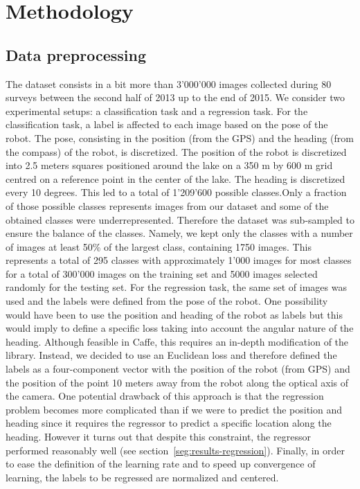 \section{Methodology}

%

%

\subsection{Data preprocessing}


The dataset consists in a bit more than 3'000'000 images collected during 80 surveys between the second half of 2013 up to the end of 2015. We consider two experimental setups: a classification task and a regression task. For the classification task, a label is affected to each image based on the pose of the robot. The pose, consisting in the position (from the GPS) and the heading (from the compass) of the robot, is discretized. The position of the robot is discretized into 2.5 meters squares positioned around the lake on a 350 m by 600 m grid centred on a reference point in the center of the lake. The heading is discretized every 10 degrees. This led to a total of 1'209'600 possible classes.Only a fraction of those possible classes represents images from our dataset and some of the obtained classes were underrepresented. Therefore the dataset was sub-sampled to ensure the balance of the classes. Namely, we kept only the classes with a number of images at least 50\% of the largest class, containing 1750 images. This represents a total of 295 classes with approximately 1'000 images for most classes for a total of 300'000 images on the training set and 5000 images selected randomly for the testing set. For the regression task, the same set of images was used and the labels were defined from the pose of the robot. One possibility would have been to use the position and heading of the robot as labels but this would imply to define a specific loss taking into account the angular nature of the heading. Although feasible in Caffe, this requires an in-depth modification of the library. Instead, we decided to use an Euclidean loss and therefore defined the labels as a four-component vector with the position of the robot (from GPS) and the position of the point 10 meters away from the robot along the optical axis of the camera. One potential drawback of this approach is that the regression problem becomes more complicated than if we were to predict the position and heading since it requires the regressor to predict a specific location along the heading. However it turns out that despite this constraint, the regressor performed reasonably well (see section~\ref{seg:results-regression}). Finally, in order to ease the definition of the learning rate and to speed up convergence of learning, the labels to be regressed are normalized and centered.


